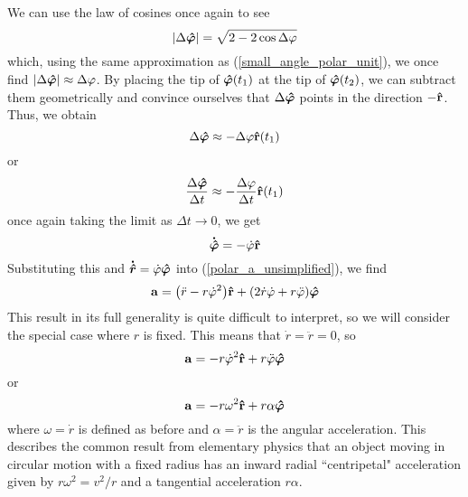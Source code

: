 We can use the law of cosines once again to see
\[ \abs{\Delta\bm{\hat{\varphi}}} = \sqrt{2-2\cos\Delta\varphi} \]
which, using the same approximation as (\ref{small_angle_polar_unit}), we once find $\abs{\Delta \bm{\hat{\varphi}}} \approx \Delta \varphi$. By placing the tip of $\bm{\hat{\varphi}}(t_1)$ at the tip of $\bm{\hat{\varphi}}(t_2)$, we can subtract them geometrically and convince ourselves that $\Delta \bm{\hat{\varphi}}$ points in the direction $-\mathbf{\hat{r}}$. Thus, we obtain
\[ \Delta\bm{\hat{\varphi}} \approx -\Delta \varphi \mathbf{\hat{r}}(t_1)\]
or
\[ \frac{\Delta \bm{\hat{\varphi}}}{\Delta t} \approx -\frac{\Delta \varphi}{\Delta t}\mathbf{\hat{r}}(t_1)\]
once again taking the limit as $\Delta t\to 0$, we get
\[ \bm{\dot{\hat{\varphi}}} = -\dot {\varphi} \mathbf{\hat{r}}\]
Substituting this and $\bm{\dot{\hat{r}}} = \dot{\varphi}\bm{\hat{\varphi}}$ into (\ref{polar_a_unsimplified}), we find
\begin{equation} \label{polaracceleration}
    \mbf{a} = \pqty{\ddot r - r\dot{\phi}^2}\rhat + \pqty{2\dot{r}\dot\phi + r\ddot{\phi}}\phihat
\end{equation}
This result in its full generality is quite difficult to interpret, so we will consider the special case where $r$ is fixed. This means that $\dot r = \ddot r = 0$, so
\[ \mathbf{a} = -r\dot{\varphi}^2\mathbf{\hat{r}} + r\ddot{\varphi}\bm{\hat{\varphi}} \]
or
\[ \mathbf{a} = -r\omega^2\mathbf{\hat{r}} + r\alpha \bm{\hat{\varphi}}\]
where $\omega = \dot r$ is defined as before and $\alpha = \ddot r$ is the angular acceleration. This describes the common result from elementary physics that an object moving in circular motion with a fixed radius has an inward radial ``centripetal" acceleration given by $r\omega^2 = v^2/r$ and a tangential acceleration $r\alpha$.

